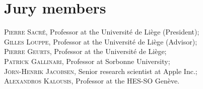 
\chapter*{Jury members}


\noindent \textsc{Pierre Sacr{\'e}}, Professor at the Universit{\'e} de Li{\`e}ge (President); \\

\noindent \textsc{Gilles Louppe}, Professor at the Universit{\'e} de Li{\`e}ge (Advisor); \\

\noindent \textsc{Pierre Geurts}, Professor at the Universit{\'e} de Li{\`e}ge; \\

\noindent \textsc{Patrick Gallinari}, Professor at Sorbonne University; \\

\noindent \textsc{J{\"o}rn-Henrik Jacobsen}, Senior research scientist at Apple Inc.; \\

\noindent \textsc{Alexandros Kalousis}, Professor at the HES-SO Gen{\`e}ve. \\
